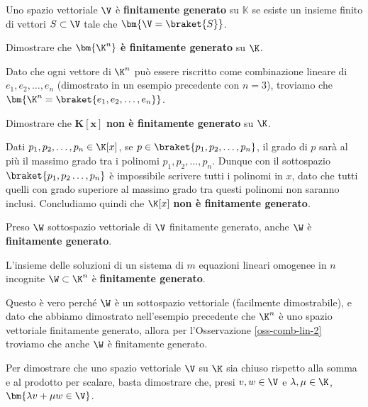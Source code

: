 \documentclass[11pt, a4paper, titlepage, oneside]{scrbook}
\begin{document}
\begin{Definizione}
\label{def-spa-vet-fin-gen}
Uno spazio vettoriale $\V$ è \textbf{finitamente generato} su $\mathbb{K}$ se esiste un insieme finito di vettori $S \subset \V$ tale che $\bm{\V = \braket{S}}$.
\end{Definizione}

\Esempi \nopagebreak

Dimostrare che $\bm{\K^n}$ \textbf{è finitamente generato} su $\K$. \nopagebreak

Dato che ogni vettore di $\K^n$ può essere riscritto come combinazione lineare di $e_1, e_2, \ldots, e_n$ (dimostrato in un esempio precedente con $n = 3$), troviamo che $\bm{\K^n = \braket{e_1, e_2, \ldots, e_n}}$.

\Separatore

Dimostrare che $\bm{K[x]}$ \textbf{non è finitamente generato} su $\K$. \nopagebreak

Dati $p_1, p_2, \ldots, p_n \in \K[x]$, se $p \in \braket{p_1, p_2, \ldots, p_n}$, il grado di $p$ sarà al più il massimo grado tra i polinomi $p_1, p_2, \ldots, p_n$. Dunque con il sottospazio $\braket{p_1, p_2 \ldots, p_n}$ è impossibile scrivere tutti i polinomi in $x$, dato che tutti quelli con grado superiore al massimo grado tra questi polinomi non saranno inclusi. Concludiamo quindi che $\K[x]$ \textbf{non è finitamente generato}. 

\begin{Osservazione}[]
\label{oss-comb-lin-2}
Preso $\W$ sottospazio vettoriale di $\V$ finitamente generato, anche $\W$ è \textbf{finitamente generato}.
\end{Osservazione}

\begin{Proposizione}[Corollario]
\label{propos-comb-lin-2}
L'insieme delle soluzioni di un sistema di $m$ equazioni lineari omogenee in $n$ incognite $\W \subset \K^n$ è \textbf{finitamente generato}.
\end{Proposizione}
Questo è vero perché $\W$ è un sottospazio vettoriale (facilmente dimostrabile), e dato che abbiamo dimostrato nell'esempio precedente che $\K^n$ è uno spazio vettoriale finitamente generato, allora per l'Osservazione \ref{oss-comb-lin-2} troviamo che anche $\W$ è finitamente generato.

\begin{Osservazione}[]
\label{oss-com-lin-3}
Per dimostrare che uno spazio vettoriale $\V$ su $\K$ sia chiuso rispetto alla somma e al prodotto per scalare, basta dimostrare che, presi $v, w \in \V$ e $\lambda, \mu \in \K$, $\bm{\lambda v + \mu w \in \V}$.
\end{Osservazione}
\end{document}
